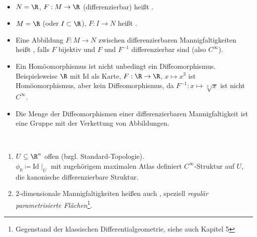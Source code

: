 \begin{remark}
  \
  \begin{itemize}
    \item \( N = \R \), \( F:M \to \R \) (differenzierbar) heißt .
    \item \( M = \R \) (oder \( I \subset \R \)), \( F: I \to N \) heißt .
    \item Eine Abbildung \( F: M \to N \) zwischen differenzierbaren Mannigfaltigkeiten heißt \label{def:diffeomorphismus}, falls \( F \) bijektiv und \( F \) und \( F^{-1} \) differenzierbar sind (also \( C^\infty \)).
    \item Ein Homöomorphismus ist nicht unbedingt ein Diffeomorphismus. Beispielsweise \( \R \) mit Id als Karte, \( F : \R \to \R \), \( x \mapsto x^3 \) ist Homöomorphismus, aber kein Diffeomorphismus, da \( F^{-1} : x \mapsto \sqrt[3]{x} \) ist nicht \( C^\infty \).
    \item Die Menge der Diffeomorphismen einer differenzierbaren Mannigfaltigkeit ist eine Gruppe mit der Verkettung von Abbildungen.
  \end{itemize}
\end{remark}

\begin{example}
  \
  \begin{enumerate}
    \item \( U \subseteq \R^n \) offen (bzgl. Standard-Topologie). \\
      \( \phi_0 \coloneqq \text{Id}\mid_U \) mit zugehörigem maximalen Atlas definiert \( C^\infty \)-Struktur auf \( U \), die kanonische differenzierbare Struktur.
    \item \( 2 \)-dimensionale Mannigfaltigkeiten heißen auch \label{def:flaeche}, speziell \emph{regulär parametrisierte Flächen}\footnote{Gegenstand der klassischen Differentialgeometrie, siehe auch Kapitel 5}.
  \end{enumerate}
\end{example}

